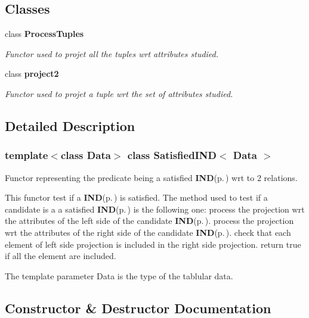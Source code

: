 \subsection*{Classes}
\begin{CompactItemize}
\item 
class {\bf Process\-Tuples}
\begin{CompactList}\small\item\em Functor used to projet all the tuples wrt attributes studied. \item\end{CompactList}\item 
class {\bf project2}
\begin{CompactList}\small\item\em Functor used to projet a tuple wrt the set of attributes studied. \item\end{CompactList}\end{CompactItemize}


\subsection{Detailed Description}
\subsubsection*{template$<$class Data$>$ class Satisfied\-IND$<$ Data $>$}

Functor representing the predicate being a satisfied {\bf IND}{\rm (p.\,\pageref{class_i_n_d})} wrt to 2 relations. 

This functor test if a {\bf IND}{\rm (p.\,\pageref{class_i_n_d})} is satisfied. The method used to test if a candidate is a a satisfied {\bf IND}{\rm (p.\,\pageref{class_i_n_d})} is the following one: process the projection wrt the attributes of the left side of the candidate {\bf IND}{\rm (p.\,\pageref{class_i_n_d})}. process the projection wrt the attributes of the right side of the candidate {\bf IND}{\rm (p.\,\pageref{class_i_n_d})}. check that each element of left side projection is included in the right side projection. return true if all the element are included.

The template parameter Data is the type of the tablular data. 



\subsection{Constructor \& Destructor Documentation}
